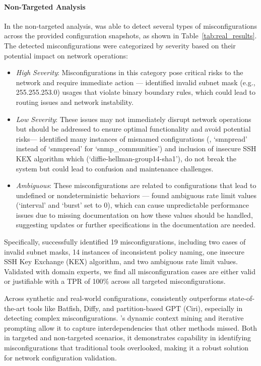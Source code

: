 \paragraph{Non-Targeted Analysis}
In the non-targeted analysis, \sysname{} was able to detect several types of misconfigurations across the provided configuration snapshots, as shown in Table~\ref{tab:real_results}.
The detected misconfigurations were categorized by severity based on their potential impact on network operations:
\begin{itemize}
    \item \textit{High Severity}: Misconfigurations in this category pose critical risks to the network and require immediate action --- \sysname{} identified invalid subnet mask (e.g., 255.255.253.0) usages that violate binary boundary rules, which could lead to routing issues and network instability.
    \item \textit{Low Severity}: These issues may not immediately disrupt network operations but should be addressed to ensure optimal functionality and avoid potential risks---
    \sysname{} identified many instances of misnamed configurations (\eg, `smnpread' instead of `snmpread' for `snmp\_communities') and inclusion of insecure SSH KEX algorithm which (`diffie-hellman-group14-sha1'), do not break the system but could lead to confusion and maintenance challenges.
    \item \textit{Ambiguous}: These misconfigurations are related to configurations that lead to undefined or nondeterministic behaviors --- \sysname{} found ambiguous rate limit values (`interval' and `burst' set to 0), which can cause unpredictable performance issues due to missing documentation on how these values should be handled, suggesting updates or further specifications in the documentation are needed.
\end{itemize}

Specifically, \sysname{} successfully identified 19 misconfigurations, including two cases of invalid subnet masks, 14 instances of inconsistent policy naming, one insecure SSH Key Exchange (KEX) algorithm, and two ambiguous rate limit values. Validated with domain experts, we find all misconfiguration cases are either valid or justifiable with a TPR of 100\% across all targeted misconfigurations.

Across synthetic and real-world configurations, \sysname{} consistently outperforms state-of-the-art tools like Batfish, Diffy, and partition-based GPT (Ciri), especially in detecting complex misconfigurations. \sysname{}'s dynamic context mining and iterative prompting allow it to capture interdependencies that other methods missed. Both in targeted and non-targeted scenarios, it demonstrates capability in identifying misconfigurations that traditional tools overlooked, making it a robust solution for network configuration validation.